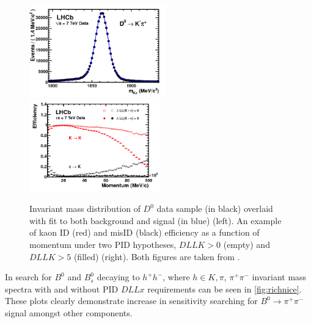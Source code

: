 \begin{figure}[!h]
	\centering
	\includegraphics[width = 0.525\textwidth]{figs/detector/D0mass.png}%
	\includegraphics[width = 0.5\textwidth]{figs/detector/RICHperfdata.png}%
	\caption{Invariant mass distribution of $D^{0}$ data sample (in black) overlaid with fit to both background and signal (in blue) (left). An example of kaon \Gls{ID} (red) and \Gls{misID} (black) efficiency as a function of momentum under two PID hypotheses, $DLL{K} > 0$ (empty)  and $DLL{K} > 5$ (filled) (right). Both figures are taken from \cite{LHCb-DP-2012-003}.}
	\label{fig:richperf}
\end{figure}

In search for $B^{0}$ and $B^{0}_{s}$ decaying to $h^{+}h^{-}$, where $h\in K, \pi$, $\pi^{+} \pi^{-}$ invariant mass spectra with and without PID $DLL{x}$ requirements can be seen in \autoref{fig:richnice}. These plots clearly demonstrate increase in sensitivity searching for $B^{0} \rightarrow \pi^{+} \pi^{-}$ signal amongst other components. 

